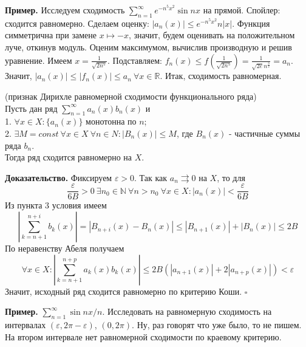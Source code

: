 \textbf{Пример.} Исследуем сходимость $\sum\limits_{n=1}^{\infty} e^{-n^5x^2}
\sin{nx}$ на прямой. Спойлер: сходится равномерно. Сделаем оценку:  
$|a_n(x)|\leqslant e^{-n^5x^2}n|x|$. Функция симметрична при замене $x\mapsto
-x$, значит, будем оценивать на положительном луче, откинув модуль. Оценим
максимумом, вычислив производную и решив уравнение. Имеем  $x=\frac{1}
{\sqrt{2n^5}}$. Подставляем: $f_n(x)\leqslant f(\frac{1}{\sqrt{2n^5} })=
\frac{1}{\sqrt{2e}n^{\frac{3}{2}}}=a_n$. Значит, $|a_n(x)|\leqslant |f_n(x)|
\leqslant a_n~\forall x\in\mathbb{R}$. Итак, сходимость равномерная. 
\begin{theor}
(признак Дирихле равномерной сходимости функционального ряда)\\
Пусть дан ряд $\sum\limits_{n=1}^{\infty} a_n(x)b_n(x)$ и\\
1. $\forall x\in X: \{a_n(x)\}$ монотонна по $n$;\\
2.  $\exists M=const~ \forall x\in X~\forall n\in N:|B_n(x)|\leqslant M$,
где $B_n(x)$ - частичные суммы ряда  $b_n$.\\
Тогда ряд сходится равномерно на $X$.
\end{theor}
\textbf{Доказательство.} Фиксируем $\varepsilon>0$. Так как 
$a_n\rightrightarrows0$ на $X$, то для  
$$\frac{\varepsilon}{6B}>0~\exists n_0\in \mathbb{N}~\forall n>n_0~
\forall x\in X:|a_n(x)|<\frac{\varepsilon}{6B}$$
Из пункта 3 условия имеем
$$\left| \sum\limits_{k=n+1}^{n+i}b_k(x) \right|=|B_{n+i}(x)-B_n(x)|
\leqslant |B_{n+1}(x)|+|B_n(x)|\leqslant 2B$$
По неравенству Абеля получаем
$$\forall x\in X:\left| \sum\limits_{k=n+1}^{n+p} a_k(x)b_k(x) \right| 
\leqslant 2B(|a_{n+1}(x)|+2|a_{n+p}(x)|)<\varepsilon$$
Значит, исходный ряд сходится равномерно по критерию Коши. $\square$ 

\textbf{Пример.} $\sum\limits_{n=1}^{\infty} \sin{nx}/n$. Исследовать на 
равномерную сходимость на интервалах $(\varepsilon,2\pi-\varepsilon)$,
$(0,2\pi)$. Ну, раз говорят что уже было, то не пишем.
На втором интервале нет равномерной сходимости по краевому критерию. 



 


